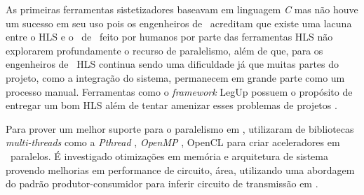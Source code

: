 		As primeiras ferramentas sistetizadores baseavam em linguagem \textit{C} mas não houve um sucesso em seu uso pois os engenheiros de \hardware\ acreditam que existe uma lacuna entre o HLS e o \design\ de \hardware\ feito por humanos por parte das ferramentas HLS não explorarem profundamente o recurso de paralelismo, além de que, para os engenheiros de \software\ HLS continua sendo uma dificuldade já que muitas partes do projeto, como a integração do sistema, permanecem em grande parte como um processo manual. Ferramentas como o \textit{framework} LegUp possuem o propósito de entregar um bom HLS além de tentar amenizar esses problemas de projetos \cite{Canis2013}.

		Para prover um melhor suporte para o paralelismo em \hardware, utilizaram de bibliotecas \textit{multi-threads} como a \textit{Pthread} \cite{Barney2009}, \textit{OpenMP} \cite{openmp}, OpenCL \cite{Trevett2008} para criar aceleradores em \hardwares\ paralelos. É investigado otimizações em memória e arquitetura de sistema provendo melhorias em performance de circuito, área, utilizando uma abordagem do padrão produtor-consumidor para inferir circuito de transmissão em \hardware.


